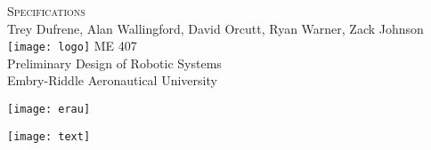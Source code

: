 \begin{titlepage}
\flushleft
\doublespacing
\Large
\textsc{Specifications} \\
\normalsize
Trey Dufrene, Alan Wallingford, David Orcutt, Ryan Warner, Zack Johnson
\vfill
\center
\texttt{[image: logo]}
\vfill
\flushleft
ME 407 \\
Preliminary Design of Robotic Systems \\
Embry-Riddle Aeronautical University \\
\vspace{2ex}
\begin{minipage}[c]{.5\textwidth}
\flushleft
\texttt{[image: erau]}
\end{minipage}%
\begin{minipage}[c]{.5\textwidth}
\flushright
\texttt{[image: text]}
\end{minipage}
\end{titlepage}
